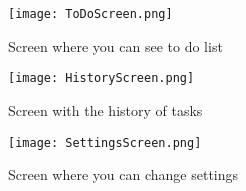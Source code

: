 \begin{figure}[ht]
	\centering
	\texttt{[image: ToDoScreen.png]}
	\caption{Screen where you can see to do list}\label{toDoScreen}
	\endminipage\hfill
	\centering
	\texttt{[image: HistoryScreen.png]}
	\caption{Screen with the history of tasks}\label{historyScreen}
	\endminipage\hfill
	\centering
	\texttt{[image: SettingsScreen.png]}
	\caption{Screen where you can change settings}\label{settingsScreen}
	\endminipage\hfill
\end{figure}